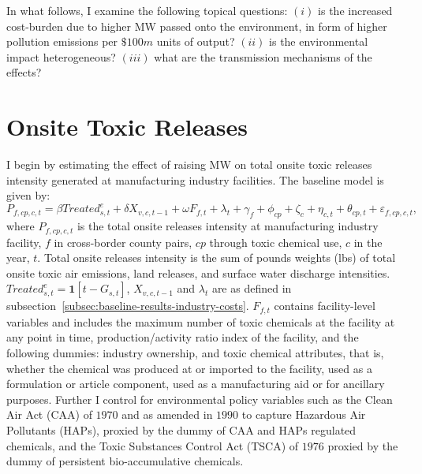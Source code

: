 \documentclass{C:/Users/david/OneDrive/Documents/ULMS/PhD/Thesis/chapter3/src/climate_change/latex/Economic_Journal/OUP-EJ}
\begin{document}
    In what follows, I examine the following topical questions: $(i)$ is the increased cost-burden due to higher MW passed onto the environment, in form of higher pollution emissions per $\$100m$ units of output? $(ii)$ is the environmental impact heterogeneous? $(iii)$ what are the transmission mechanisms of the effects?


    \section{Onsite Toxic Releases}\label{sec:onsite-toxic-releases}
    I begin by estimating the effect of raising MW on total onsite toxic releases intensity generated at manufacturing industry facilities. The baseline model is given by:
    \begin{equation}
        P_{f,cp,c,t} = \beta Treated_{s,t}^e + \delta X_{v,c,t-1} + \omega F_{f,t} + \lambda_{t} + \gamma_{f} + \phi_{cp} + \zeta_{c} + \eta_{c,t} + \theta_{cp,t} + \varepsilon_{f,cp,c,t},\label{eq:baseline-total-onsite-releases-intensity}
    \end{equation}
    where $P_{f,cp,c,t}$ is the total onsite releases intensity at manufacturing industry facility, $f$ in cross-border county pairs, $cp$ through toxic chemical use, $c$ in the year, $t$. Total onsite releases intensity is the sum of pounds weights (lbs) of total onsite toxic air emissions, land releases, and surface water discharge intensities. $Treated_{s,t}^e = \textbf{1}[t - G_{s,t}]$, $X_{v,c,t-1}$ and $\lambda_{t}$ are as defined in subsection~\ref{subsec:baseline-results-industry-costs}. $F_{f,t}$ contains facility-level variables and includes the maximum number of toxic chemicals at the facility at any point in time, production/activity ratio index of the facility, and the following dummies: industry ownership, and toxic chemical attributes, that is, whether the chemical was produced at or imported to the facility, used as a formulation or article component, used as a manufacturing aid or for ancillary purposes. Further I control for environmental policy variables such as the Clean Air Act (CAA) of $1970$ and as amended in $1990$ to capture Hazardous Air Pollutants (HAPs), proxied by the dummy of CAA and HAPs regulated chemicals, and the Toxic Substances Control Act (TSCA) of $1976$ proxied by the dummy of persistent bio-accumulative chemicals.
\end{document}
